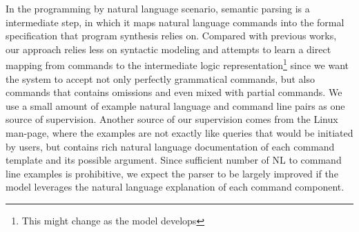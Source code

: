 In the programming by natural language scenario, semantic parsing is a intermediate step, in which it maps natural language commands into the formal specification that program synthesis relies on. Compared with previous works, our approach relies less on syntactic modeling and attempts to learn a direct mapping from commands to the intermediate logic representation\footnote{This might change as the model develops} since we want the system to accept not only perfectly grammatical commands, but also commands that contains omissions and even mixed with partial commands. We use a small amount of example natural language and command line pairs as one source of supervision. Another source of our supervision comes from the Linux man-page, where the examples are not exactly like queries that would be initiated by users, but contains rich natural language documentation of each command template and its possible argument. Since sufficient number of NL to command line examples is prohibitive, we expect the parser to be largely improved if the model leverages the natural language explanation of each command component.
